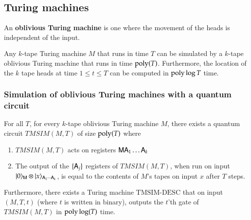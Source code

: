 \subsection{Turing machines}
\label{sec:turing_machines}


An \textbf{oblivious Turing machine} is one where the movement of the heads is independent of the input.

\begin{theorem}\label{thm:pippenger}
Any $k$-tape Turing machine $M$ that runs in time $T$ can be simulated by a $k$-tape oblivious Turing machine that runs in time $\operatorname{poly}(T)$. Furthermore, the location of the $k$ tape heads at time $1 \leq t \leq T$ can be computed in $\operatorname{poly} \log T$ time.
\end{theorem}


\subsubsection{Simulation of oblivious Turing machines with a quantum circuit}

\begin{lemma}\label{lem:tmsim}
	For all $T$, for every $k$-tape oblivious Turing machine $M$, there exists a quantum circuit $TMSIM(M,T)$ of size $\operatorname{poly}(T)$ where
	\begin{enumerate}
		\item $TMSIM(M,T)$ acts on registers ${\mathsf{M}} {\mathsf{A}}_1 \ldots {\mathsf{A}}_k$
		\item The output of the $\{{\mathsf{A}}_j\}$ registers of $TMSIM(M,T)$, when run on input $|0\rangle_{{\mathsf{M}}} \otimes |x\rangle_{{\mathsf{A}}_1 \cdots {\mathsf{A}}_k}$, is equal to the contents of $M$'s tapes on input $x$ after $T$ steps.
	\end{enumerate}
	Furthermore, there exists a Turing machine $\text{TMSIM-DESC}$ that on input $(M,T,t)$ (where $t$ is written in binary), outputs the $t$'th gate of $TMSIM(M,T)$ in $\operatorname{poly}\log(T)$ time. 
\end{lemma}

